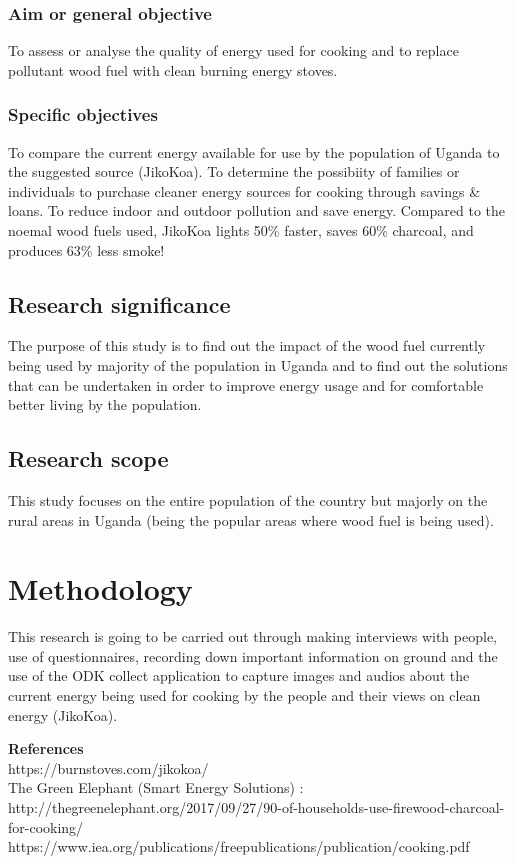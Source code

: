 \documentclass[12pt, a4paper]{article}
\begin{document}
\subsubsection{Aim or general objective}
To assess or analyse the quality of energy used for cooking and to replace pollutant wood fuel with clean burning energy stoves.
\subsubsection{Specific objectives}
To compare  the current energy available for use by the population of Uganda to the suggested source (JikoKoa).
To determine the possibiity of families or individuals to purchase cleaner energy sources for cooking through savings \& loans.
To reduce indoor and outdoor pollution and save energy.
Compared to the noemal wood fuels used, JikoKoa lights 50\% faster, saves 60\% charcoal, and produces 63\% less smoke!


\subsection{Research significance}
The purpose of this study is to find out the impact of the wood fuel currently being used by majority of the population in Uganda and to find out the solutions that can be undertaken in order to improve energy usage and for comfortable better living by the population.




\subsection{Research scope}
This study focuses on the entire population of the country but majorly on the rural areas in Uganda (being the popular areas where wood fuel is being used).

\section{Methodology}
This research is going to be carried out through making interviews with people, use of questionnaires, recording down important information on ground and the use of  the  ODK collect application to capture images and audios about the current energy being used for cooking by the people and their views on clean energy (JikoKoa).
\clearpage

\Large{\textbf{References}}\\

\normalsize https://burnstoves.com/jikokoa/\\
The Green Elephant (Smart Energy Solutions) :
http://thegreenelephant.org/2017/09/27/90-of-households-use-firewood-charcoal-for-cooking/
https://www.iea.org/publications/freepublications/publication/cooking.pdf
\end{document}
